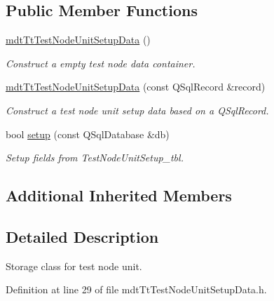 \subsection*{Public Member Functions}
\begin{DoxyCompactItemize}
\item 
\hyperlink{classmdt_tt_test_node_unit_setup_data_a0d9372606909ab76e423f8aa180a9c38}{mdt\-Tt\-Test\-Node\-Unit\-Setup\-Data} ()
\begin{DoxyCompactList}\small\item\em Construct a empty test node data container. \end{DoxyCompactList}\item 
\hyperlink{classmdt_tt_test_node_unit_setup_data_aee5b9ec83805c0ef6fecae14adcee518}{mdt\-Tt\-Test\-Node\-Unit\-Setup\-Data} (const Q\-Sql\-Record \&record)
\begin{DoxyCompactList}\small\item\em Construct a test node unit setup data based on a Q\-Sql\-Record. \end{DoxyCompactList}\item 
bool \hyperlink{classmdt_tt_test_node_unit_setup_data_a2a2bb93f0ceb79adec8b4692cf1afb39}{setup} (const Q\-Sql\-Database \&db)
\begin{DoxyCompactList}\small\item\em Setup fields from Test\-Node\-Unit\-Setup\-\_\-tbl. \end{DoxyCompactList}\end{DoxyCompactItemize}
\subsection*{Additional Inherited Members}


\subsection{Detailed Description}
Storage class for test node unit. 

Definition at line 29 of file mdt\-Tt\-Test\-Node\-Unit\-Setup\-Data.\-h.



